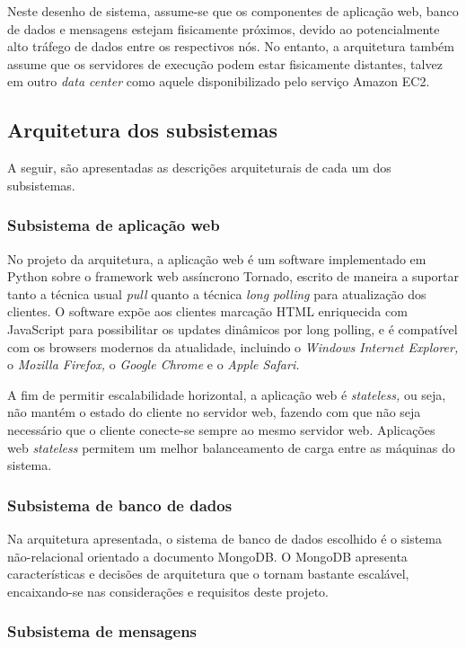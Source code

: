 \documentclass[ruledheader, 12pt]{abnt}
\begin{document}
Neste desenho de sistema, assume-se que os componentes de aplicação web, banco de dados e mensagens estejam fisicamente próximos, devido ao potencialmente alto tráfego de dados entre os respectivos nós. No entanto, a arquitetura também assume que os servidores de execução podem estar fisicamente distantes, talvez em outro \emph{data center} como aquele disponibilizado pelo serviço Amazon EC2.

\subsection{Arquitetura dos subsistemas}

A seguir, são apresentadas as descrições arquiteturais de cada um dos subsistemas.

\subsubsection{Subsistema de aplicação web}

No projeto da arquitetura, a aplicação web é um software implementado em Python sobre o framework web assíncrono Tornado, escrito de maneira a suportar tanto a técnica usual \emph{pull} quanto a técnica \emph{long polling} para atualização dos clientes. O software expõe aos clientes marcação HTML enriquecida com JavaScript para possibilitar os updates dinâmicos por long polling, e é compatível com os browsers modernos da atualidade, incluindo o \emph{Windows Internet Explorer,} o \emph{Mozilla Firefox,} o \emph{Google Chrome} e o \emph{Apple Safari.}

A fim de permitir escalabilidade horizontal, a aplicação web é \emph{stateless,} ou seja, não mantém o estado do cliente no servidor web, fazendo com que não seja necessário que o cliente conecte-se sempre ao mesmo servidor web. Aplicações web \emph{stateless} permitem um melhor balanceamento de carga entre as máquinas do sistema.

\subsubsection{Subsistema de banco de dados}

Na arquitetura apresentada, o sistema de banco de dados escolhido é o sistema não-relacional orientado a documento MongoDB. O MongoDB apresenta características e decisões de arquitetura que o tornam bastante escalável, encaixando-se nas considerações e requisitos deste projeto.

\subsubsection{Subsistema de mensagens}
\end{document}
